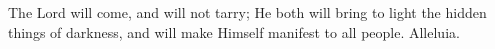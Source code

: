 The Lord will come, and will not tarry; He both will bring to light the hidden things of darkness, and will make Himself manifest to all people. Alleluia.